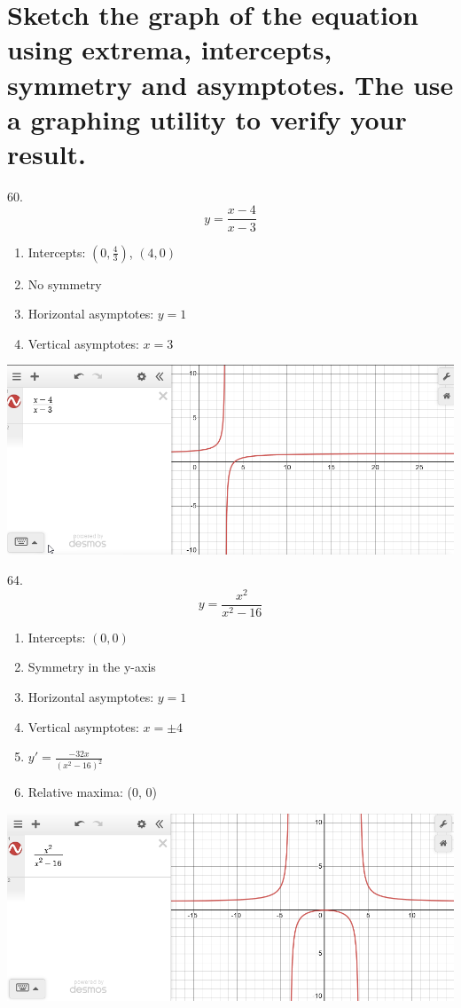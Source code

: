 \documentclass[11pt]{article}
\begin{document}
\section{Sketch the graph of the equation using extrema, intercepts, symmetry and asymptotes. The use a graphing utility to verify your result.}
60.\[y=\frac{x-4}{x-3}\]
\begin{enumerate}
    \item Intercepts: $(0, \frac{4}{3})$, $(4, 0)$
    \item No symmetry
    \item Horizontal asymptotes: $y=1$
    \item Vertical asymptotes: $x=3$
\end{enumerate}
\includegraphics[scale=0.5]{60.png}

64.\[y=\frac{x^2}{x^2-16}\]
\begin{enumerate}
    \item Intercepts: $(0, 0)$
    \item Symmetry in the y-axis
    \item Horizontal asymptotes: $y=1$
    \item Vertical asymptotes: $x=\pm 4$
    \item $y'=\frac{-32x}{(x^2-16)^2}$
    \item Relative maxima: (0, 0)
\end{enumerate}
\includegraphics[scale=0.5]{61.png}
\end{document}
